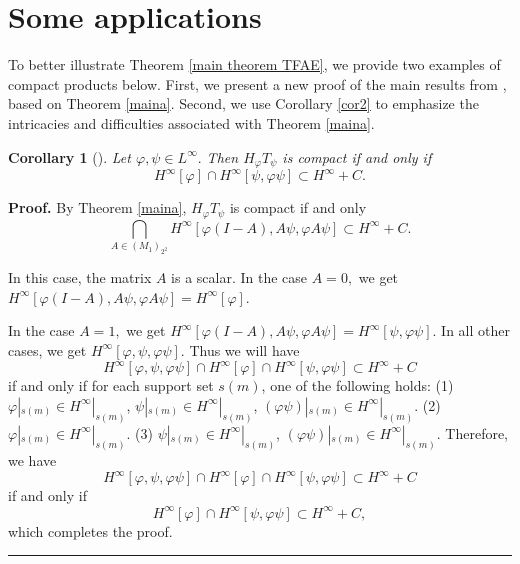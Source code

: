 \documentclass{article}%
\newtheorem{corollary}[theorem]{Corollary}
\newenvironment{proof}[1][Proof]{\noindent\textbf{#1.} }{\ \rule{0.5em}{0.5em}}
\begin{document}
\section{Some applications}

\label{Section 5}

To better illustrate Theorem \ref{main theorem TFAE}, we provide two examples
of compact products below. First, we present a new proof of the main results
from \cite{ChengChu15}, based on Theorem \ref{maina}. Second, we use
Corollary \ref{cor2} to emphasize the intricacies and difficulties associated
with Theorem \ref{maina}.

\begin{corollary}
[\cite{ChengChu15}]Let $\varphi,\psi\in L^{\infty}.$ Then $H_{\varphi}%
T_{\psi}$ is compact if and only if
\[
H^{\infty}\left[  \varphi\right]  \cap H^{\infty}\left[  \psi,\varphi
\psi\right]  \subset H^{\infty}+C.
\]

\end{corollary}

\begin{proof}
By Theorem \ref{maina}, $H_{\varphi}T_{\psi}$ is compact if and only
\[
\bigcap_{A\in\left(  M_{1}\right)  _{2^{2}}}H^{\infty}\left[  \varphi
(I-A),A\psi,\varphi A\psi\right]  \subset H^{\infty}+C.
\]


In this case, the matrix $A$ is a scalar. In the case $A=0,$ we get
$H^{\infty}\left[  \varphi(I-A),A\psi,\varphi A\psi\right]  =H^{\infty}\left[
\varphi\right]  $.

In the case $A=1,$ we get $H^{\infty}\left[  \varphi(I-A),A\psi,\varphi
A\psi\right]  =H^{\infty}\left[  \psi,\varphi\psi\right]  .$ In all other
cases, we get $H^{\infty}\left[  \varphi, \psi,\varphi\psi\right]  $. Thus we
will have
\[
H^{\infty}\left[  \varphi, \psi,\varphi\psi\right]  \cap H^{\infty}\left[
\varphi\right]  \cap H^{\infty}\left[  \psi,\varphi\psi\right]  \subset
H^{\infty}+C
\]
if and only if for each support set $s(m)$, one of the following holds: (1)
$\varphi|_{s(m)}\in H^{\infty}|_{s(m)}$, $\psi|_{s(m)}\in H^{\infty}|_{s(m)}$,
$(\varphi\psi)|_{s(m)}\in H^{\infty}|_{s(m)}.$ (2) $\varphi|_{s(m)}\in
H^{\infty}|_{s(m)}.$ (3) $\psi|_{s(m)}\in H^{\infty}|_{s(m)}$, $(\varphi
\psi)|_{s(m)}\in H^{\infty}|_{s(m)}.$ Therefore, we have
\[
H^{\infty}\left[  \varphi, \psi,\varphi\psi\right]  \cap H^{\infty}\left[
\varphi\right]  \cap H^{\infty}\left[  \psi,\varphi\psi\right]  \subset
H^{\infty}+C
\]
if and only if
\[
H^{\infty}\left[  \varphi\right]  \cap H^{\infty}\left[  \psi,\varphi
\psi\right]  \subset H^{\infty}+C,
\]
which completes the proof.
\end{proof}
\end{document}
